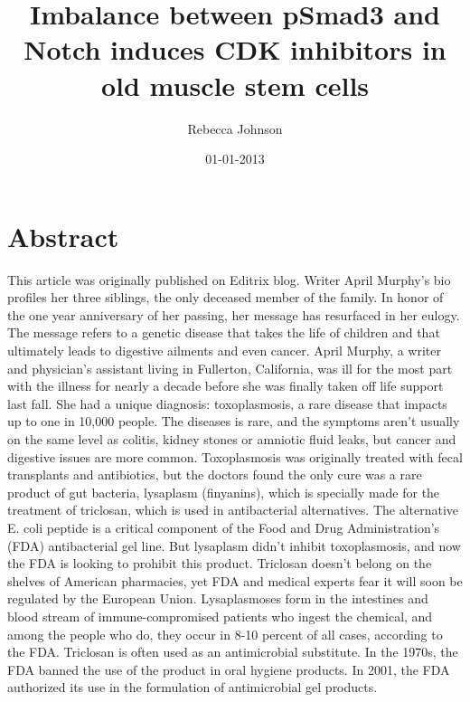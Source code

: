 \documentclass{article}%
\title{Imbalance between pSmad3 and Notch induces CDK inhibitors in old muscle stem cells}%
\author{Rebecca Johnson}%
\affil{Department of Biology and Biochemistry and the Centre for Regenerative Medicine, University of Bath, Bath, United Kingdom, \newline%
    Department of Pharmacy and Pharmacology and the Centre for Regenerative Medicine, University of Bath, Bath, United Kingdom}%
\date{01{-}01{-}2013}%
\begin{document}
%
\normalsize%
\maketitle%
\section{Abstract}%
\label{sec:Abstract}%
This article was originally published on Editrix blog.\newline%
Writer April Murphy's bio profiles her three siblings, the only deceased member of the family. In honor of the one year anniversary of her passing, her message has resurfaced in her eulogy. The message refers to a genetic disease that takes the life of children and that ultimately leads to digestive ailments and even cancer.\newline%
April Murphy, a writer and physician's assistant living in Fullerton, California, was ill for the most part with the illness for nearly a decade before she was finally taken off life support last fall. She had a unique diagnosis: toxoplasmosis, a rare disease that impacts up to one in 10,000 people. The diseases is rare, and the symptoms aren't usually on the same level as colitis, kidney stones or amniotic fluid leaks, but cancer and digestive issues are more common.\newline%
Toxoplasmosis was originally treated with fecal transplants and antibiotics, but the doctors found the only cure was a rare product of gut bacteria, lysaplasm (finyanins), which is specially made for the treatment of triclosan, which is used in antibacterial alternatives. The alternative E. coli peptide is a critical component of the Food and Drug Administration's (FDA) antibacterial gel line. But lysaplasm didn't inhibit toxoplasmosis, and now the FDA is looking to prohibit this product.\newline%
Triclosan doesn't belong on the shelves of American pharmacies, yet FDA and medical experts fear it will soon be regulated by the European Union.\newline%
Lysaplasmoses form in the intestines and blood stream of immune{-}compromised patients who ingest the chemical, and among the people who do, they occur in 8{-}10 percent of all cases, according to the FDA.\newline%
Triclosan is often used as an antimicrobial substitute. In the 1970s, the FDA banned the use of the product in oral hygiene products. In 2001, the FDA authorized its use in the formulation of antimicrobial gel products.\newline%
\end{document}
